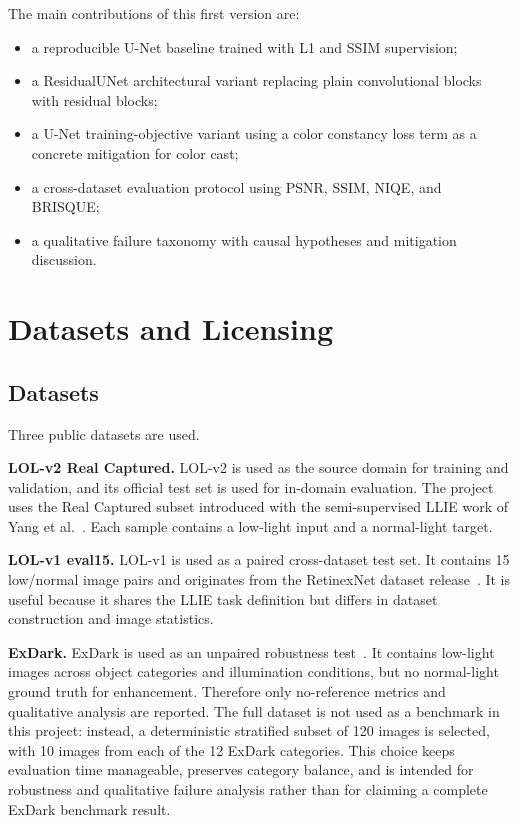 \documentclass[10pt,twocolumn]{article}
\begin{document}
The main contributions of this first version are:
\begin{itemize}
    \item a reproducible U-Net baseline trained with L1 and SSIM supervision;
    \item a ResidualUNet architectural variant replacing plain convolutional blocks with residual blocks;
    \item a U-Net training-objective variant using a color constancy loss term as a concrete mitigation for color cast;
    \item a cross-dataset evaluation protocol using PSNR, SSIM, NIQE, and BRISQUE;
    \item a qualitative failure taxonomy with causal hypotheses and mitigation discussion.
\end{itemize}

\section{Datasets and Licensing}
\subsection{Datasets}
Three public datasets are used.

\textbf{LOL-v2 Real Captured.} LOL-v2 is used as the source domain for training and validation, and its official test set is used for in-domain evaluation. The project uses the Real Captured subset introduced with the semi-supervised LLIE work of Yang et al.~\cite{yang2020semisupervised}. Each sample contains a low-light input and a normal-light target.

\textbf{LOL-v1 eval15.} LOL-v1 is used as a paired cross-dataset test set. It contains 15 low/normal image pairs and originates from the RetinexNet dataset release~\cite{wei2018retinexnet}. It is useful because it shares the LLIE task definition but differs in dataset construction and image statistics.

\textbf{ExDark.} ExDark is used as an unpaired robustness test~\cite{loh2019exdark}. It contains low-light images across object categories and illumination conditions, but no normal-light ground truth for enhancement. Therefore only no-reference metrics and qualitative analysis are reported. The full dataset is not used as a benchmark in this project: instead, a deterministic stratified subset of 120 images is selected, with 10 images from each of the 12 ExDark categories. This choice keeps evaluation time manageable, preserves category balance, and is intended for robustness and qualitative failure analysis rather than for claiming a complete ExDark benchmark result.
\end{document}
